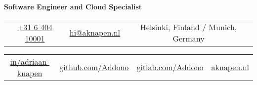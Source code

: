 \documentclass[11pt,a4paper,sans]{moderncv}
\begin{document}
\makecvtitle


\vspace*{-17mm}
\begin{center}\textbf{Software Engineer and Cloud Specialist}\end{center}

\begin{center}
	\begin{tabular}{ c c c }
		\faMobile\enspace 
		\href{tel:+31640410001}{+31 6 404 10001}
		\enspace & \enspace 
		\href{mailto:hi@aknapen.nl}{hi@aknapen.nl}
		\enspace & \enspace 
		\faHome\enspace Helsinki, Finland / Munich, Germany
	\end{tabular}
			
	\begin{tabular}{ c c c c }
		\faLinkedin\enspace \color{blue} \href{https://www.linkedin.com/in/adriaan-knapen/}{in/adriaan-knapen} &
		\enspace\enspace\faGithub\enspace \color{blue} \href{https://github.com/Addono}{github.com/Addono} & \enspace\enspace\faGitlab\enspace \color{blue} \href{https://gitlab.com/Addono}{gitlab.com/Addono} & \enspace\enspace\faHome\enspace \color{blue} \href{https://aknapen.nl}{aknapen.nl} 
	\end{tabular}
\end{center}
\end{document}
